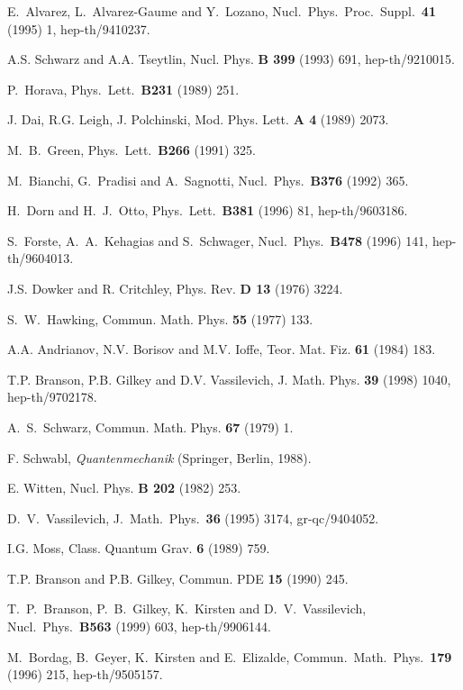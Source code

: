 \documentclass[a4paper,12pt]{article}
\begin{document}
\begin{thebibliography}{99}
E.~Alvarez, L.~Alvarez-Gaume and Y.~Lozano,
Nucl.\ Phys.\ Proc.\ Suppl.\  {\bf 41} (1995) 1,  hep-th/9410237.

A.S. Schwarz and A.A. Tseytlin, Nucl. Phys. {\bf B 399} (1993)
691, hep-th/9210015.

P.~Horava,
Phys.\ Lett.\  {\bf B231} (1989) 251.

J. Dai, R.G. Leigh, J. Polchinski, Mod. Phys. Lett. {\bf A 4}
(1989) 2073.

M.~B.~Green,
Phys.\ Lett.\  {\bf B266} (1991) 325.

M.~Bianchi, G.~Pradisi and A.~Sagnotti,
Nucl.\ Phys.\  {\bf B376} (1992) 365.

H.~Dorn and H.~J.~Otto,
Phys.\ Lett.\  {\bf B381} (1996) 81, 
hep-th/9603186.

S.~Forste, A.~A.~Kehagias and S.~Schwager,
Nucl.\ Phys.\  {\bf B478} (1996) 141,
hep-th/9604013.

J.S. Dowker and R. Critchley, Phys. Rev. {\bf D 13} (1976) 3224.

S.~W.~Hawking, Commun. Math. Phys. {\bf 55} (1977) 133.

A.A. Andrianov, N.V. Borisov and M.V. Ioffe, Teor. Mat. Fiz.
{\bf 61} (1984) 183.

T.P. Branson, P.B. Gilkey and D.V. Vassilevich,
J. Math. Phys. {\bf 39} (1998) 1040, hep-th/9702178.      

A.~S.~Schwarz, Commun. Math. Phys. {\bf 67} (1979) 1.

F. Schwabl, {\it Quantenmechanik} (Springer, Berlin, 1988).

E. Witten, Nucl. Phys. {\bf B 202} (1982) 253.

D.~V.~Vassilevich,
J.\ Math.\ Phys.\  {\bf 36} (1995) 3174, gr-qc/9404052.  

I.G. Moss, Class. Quantum Grav. {\bf 6} (1989) 759.

T.P. Branson and P.B. Gilkey, Commun. PDE {\bf 15} (1990) 245.

T.~P.~Branson, P.~B.~Gilkey, K.~Kirsten and D.~V.~Vassilevich,
Nucl.\ Phys.\  {\bf B563} (1999) 603, hep-th/9906144. 

M.~Bordag, B.~Geyer, K.~Kirsten and E.~Elizalde,
Commun.\ Math.\ Phys.\  {\bf 179} (1996) 215, hep-th/9505157.  


\end{thebibliography}
\end{document}
